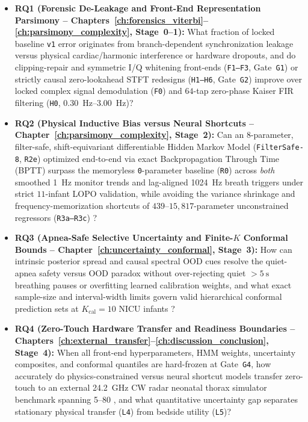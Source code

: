 \begin{itemize}
  \item \textbf{RQ1 (Forensic De-Leakage and Front-End Representation Parsimony -- Chapters~\ref{ch:forensics_viterbi}--\ref{ch:parsimony_complexity}, Stage~0--1):}
    What fraction of locked baseline \texttt{v1} error originates from branch-dependent synchronization
    leakage versus physical cardiac/harmonic interference or hardware dropouts, and do clipping-repair
    and symmetric I/Q whitening front-ends (\texttt{F1--F3}, Gate~\texttt{G1}) or strictly causal zero-lookahead STFT
    redesigns (\texttt{H1--H6}, Gate~\texttt{G2}) improve over locked complex signal demodulation
    (\texttt{F0}) and $64$-tap zero-phase Kaiser FIR filtering (\texttt{H0}, \SIrange{0.30}{3.00}{\hertz})?

  \item \textbf{RQ2 (Physical Inductive Bias versus Neural Shortcuts -- Chapter~\ref{ch:parsimony_complexity}, Stage~2):}
    Can an $8$-parameter, filter-safe, shift-equivariant differentiable Hidden Markov Model
    (\texttt{FilterSafe-8}, \texttt{R2e}) optimized end-to-end via exact Backpropagation Through
    Time (BPTT) \citep{mensch2018differentiable,riou2023pesto} surpass the memoryless \texttt{0}-parameter
    baseline (\texttt{R0}) across \emph{both} smoothed \SI{1}{\hertz} monitor trends and lag-aligned
    \SI{1024}{\hertz} breath triggers under strict $11$-infant LOPO validation, while avoiding the
    variance shrinkage and frequency-memorization shortcuts of $439$--$15{,}817$-parameter unconstrained
    regressors (\texttt{R3a--R3c}) \citep{geirhos2020shortcut}?

  \item \textbf{RQ3 (Apnea-Safe Selective Uncertainty and Finite-$K$ Conformal Bounds -- Chapter~\ref{ch:uncertainty_conformal}, Stage~3):}
    How can intrinsic posterior spread and causal spectral OOD cues resolve the quiet-apnea safety
    versus OOD paradox without over-rejecting quiet $> \SI{5}{\second}$ breathing pauses or overfitting
    learned calibration weights, and what exact sample-size and interval-width limits govern valid
    hierarchical conformal prediction sets at $K_{\mathrm{cal}}=10$ NICU infants
    \citep{dunn2023distribution}?

  \item \textbf{RQ4 (Zero-Touch Hardware Transfer and Readiness Boundaries -- Chapters~\ref{ch:external_transfer}--\ref{ch:discussion_conclusion}, Stage~4):}
    When all front-end hyperparameters, HMM weights, uncertainty composites, and conformal quantiles
    are hard-frozen at Gate~\texttt{G4}, how accurately do physics-constrained versus neural shortcut
    models transfer zero-touch to an external \SI{24.2}{\giga\hertz} CW radar neonatal thorax
    simulator benchmark spanning \SIrange{5}{80}{\bpm} \citep{gleichauf2024time}, and what quantitative
    uncertainty gap separates stationary physical transfer (\texttt{L4}) from bedside utility
    (\texttt{L5})?
\end{itemize}

